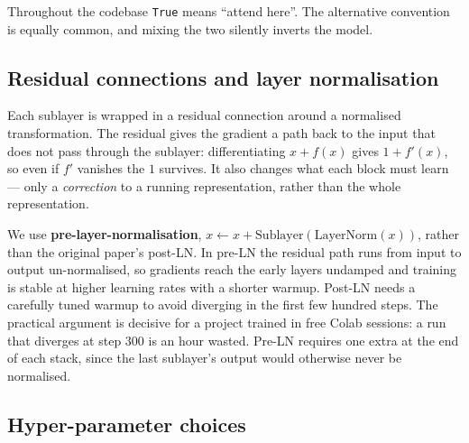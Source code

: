 \documentclass[11pt,a4paper]{article}
\begin{document}
Throughout the codebase \texttt{True} means ``attend here''. The alternative
convention is equally common, and mixing the two silently inverts the model.


\subsection{Residual connections and layer normalisation}

Each sublayer is wrapped in a residual connection around a normalised
transformation. The residual gives the gradient a path back to the input that
does not pass through the sublayer: differentiating $x + f(x)$ gives $1 +
f'(x)$, so even if $f'$ vanishes the $1$ survives. It also changes what each
block must learn --- only a \emph{correction} to a running representation,
rather than the whole representation.

We use \textbf{pre-layer-normalisation}, $x \leftarrow x + \mathrm{Sublayer}
(\mathrm{LayerNorm}(x))$, rather than the original paper's post-LN. In pre-LN
the residual path runs from input to output un-normalised, so gradients reach
the early layers undamped and training is stable at higher learning rates with
a shorter warmup. Post-LN needs a carefully tuned warmup to avoid diverging in
the first few hundred steps. The practical argument is decisive for a project
trained in free Colab sessions: a run that diverges at step 300 is an hour
wasted. Pre-LN requires one extra  at the end of each stack,
since the last sublayer's output would otherwise never be normalised.


\subsection{Hyper-parameter choices}
\label{sec:hyperparameters}

\begin{table}[htbp]
\centering
\caption{The systems compared. All four share the same data, direction tags,
optimiser, decoding code and evaluation.}
\label{tab:model}
\small

\end{table}
\end{document}
